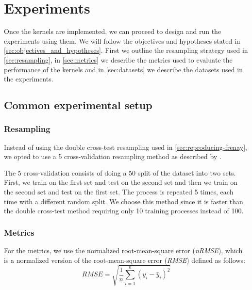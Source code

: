 \chapter{Experiments}
\label{sec:experiments}

Once the kernels are implemented, we can proceed to design and run the experiments using them.
We will follow the objectives and hypotheses stated in \cref{sec:objectives_and_hypotheses}. First
we outline the resampling strategy used in \cref{sec:resampling}, in \cref{sec:metrics} we
describe the metrics used to evaluate the performance of the kernels and in \cref{sec:datasets}
we describe the datasets used in the experiments.

\section{Common experimental setup}

\subsection{Resampling}

Instead of using the double cross-test resampling used in \cref{sec:reproducing-frenay},
we opted to use a 5 cross-validation resampling method as described by \textcite{dietterichApproximateStatisticalTests1998}.

The 5 cross-validation
consists of doing a 50 split of the dataset into two sets. First, we train on the first set and test on the second set
and then we train on the second set and test on the first set. The process is repeated 5 times, each time
with a different random split. We choose this method since it is faster than the double cross-test method
requiring only 10 training processes instead of 100.


\subsection{Metrics}

For the metrics, we use the normalized root-mean-square error (\emph{nRMSE}), which is
a normalized version of the root-mean-square error (\emph{RMSE}) defined as follows:
\begin{equation}
    RMSE = \sqrt{\frac{1}{n}\sum_{i=1}^n (y_i - \hat{y}_i)^2}
\end{equation}

